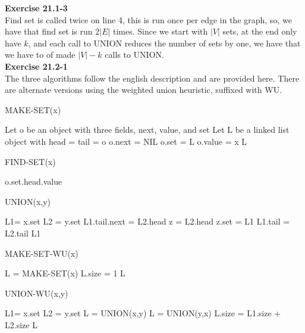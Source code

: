 \documentclass{article}
\begin{document}
\noindent\textbf{Exercise 21.1-3}\\

Find set is called twice on line 4, this is run once per edge in the graph, so, we have that find set is run $2|E|$ times. Since we start with $|V|$ sets, at the end only have $k$, and each call to UNION reduces the number of sets by one, we have that we have to of made $|V|-k$ calls to UNION.\\


\noindent\textbf{Exercise 21.2-1}\\

The three algorithms follow the english description and are provided here. There are alternate versions using the weighted union heuristic, suffixed with WU.\\
\begin{algorithm}
\caption{MAKE-SET(x)}
\begin{algorithmic}
\State Let o be an object with three fields, next, value, and set
\State Let L be a linked list object with head = tail = o
\State o.next = NIL
\State o.set = L
\State o.value = x
\State \Return L
\end{algorithmic}
\end{algorithm}
\begin{algorithm}
\caption{FIND-SET(x)}
\begin{algorithmic}
\State \Return o.set.head.value
\end{algorithmic}
\end{algorithm}
\begin{algorithm}
\caption{UNION(x,y)}
\begin{algorithmic}
\State L1= x.set
\State L2 = y.set
\State L1.tail.next = L2.head
\State z = L2.head
\State z.set = L1
\EndWhile
\State L1.tail = L2.tail
\State \Return L1
\end{algorithmic}
\end{algorithm}
\begin{algorithm}
\caption{MAKE-SET-WU(x)}
\begin{algorithmic}
\State L = MAKE-SET(x)
\State L.size = 1
\State \Return L
\end{algorithmic}
\end{algorithm}
\begin{algorithm}
\caption{UNION-WU(x,y)}
\begin{algorithmic}
\State L1= x.set
\State L2 = y.set
\State L =  UNION(x,y)
\Else
\State L =  UNION(y,x)
\EndIf
\State L.size = L1.size + L2.size
\State \Return L
\end{algorithmic}
\end{algorithm}
\end{document}
